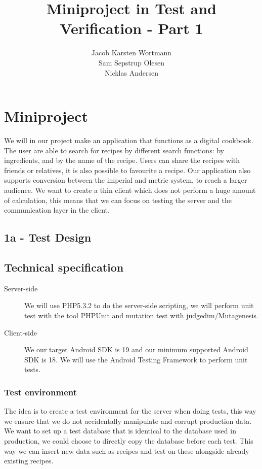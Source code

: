 \documentclass[a4paper,12pt]{memoir}
\title{Miniproject in Test and Verification - Part 1}
\author{Jacob Karsten Wortmann\\Sam Sepstrup Olesen\\Nicklas Andersen}
\begin{document}
\maketitle
\chapter*{Miniproject}
We will in our project make an application that functions as a digital cookbook. The user are able to search for recipes by different search functions: by ingredients, and by the name of the recipe. Users can share the recipes with friends or relatives, it is also possible to favourite a recipe. Our  application also supports conversion between the imperial and metric system, to reach a larger audience. 
We want to create a thin client which does not perform a huge amount of calculation, this means that we can focus on testing the server and the communication layer in the client.

\section*{1a - Test Design}
\section*{Technical specification}
\begin{description}
    \item[Server-side]
        We will use PHP5.3.2 to do the server-side scripting,
        we will perform unit test with the tool PHPUnit and mutation test with judgedim/Mutagenesis.
    \item[Client-side]
        We our target Android SDK is 19 and our minimum supported Android SDK is 18. We will use the Android Testing Framework to perform unit tests.
\end{description}

\subsection{Test environment}
The idea is to create a test environment for the server when doing tests, this way we ensure that we do not accidentally manipulate and corrupt production data. We want to set up a test database that is identical to the database used in production, we could choose to directly copy the database before each test. This way we can insert new data such as recipes and test on these alongside already existing recipes.
\end{document}
